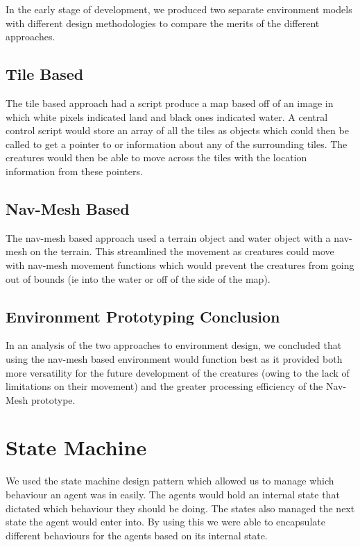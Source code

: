 \documentclass[a4paper, oneside, 11pt]{report}
\begin{document}
In the early stage of development, we produced two separate environment models with different design methodologies to compare the merits of the different approaches.

\subsection{Tile Based}
The tile based approach had a script produce a map based off of an image in which white pixels indicated land and black ones indicated water.
A central control script would store an array of all the tiles as objects which could then be called to get a pointer to or information about any of the surrounding tiles.
The creatures would then be able to move across the tiles with the location information from these pointers.

\subsection{Nav-Mesh Based}
The nav-mesh based approach used a terrain object and water object with a nav-mesh on the terrain. This streamlined the movement as creatures could move with nav-mesh movement functions which would prevent the creatures from going out of bounds (ie into the water or off of the side of the map).

\subsection{Environment Prototyping Conclusion}

In an analysis of the two approaches to environment design, we concluded that using the nav-mesh based environment would function best as it provided both more versatility for the future development of the creatures (owing to the lack of limitations on their movement) and the greater processing efficiency of the Nav-Mesh prototype.

\section{State Machine}

We used the state machine design pattern which allowed us to manage which behaviour an agent was in easily. The agents would hold an internal state that dictated which behaviour they should be doing. The states also managed the next state the agent would enter into. By using this we were able to encapsulate different behaviours for the agents based on its internal state.
\end{document}
